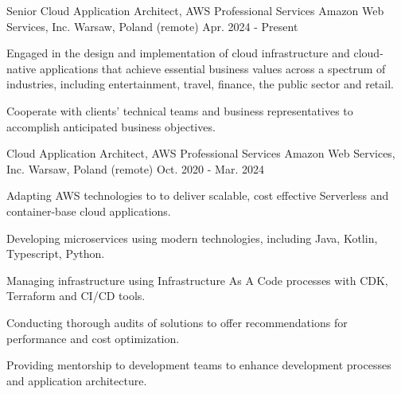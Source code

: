 

\begin{cventries}

  \cventry
    {Senior Cloud Application Architect, AWS Professional Services} %
    {Amazon Web Services, Inc.} %
    {Warsaw, Poland (remote)} %
    {Apr. 2024 - Present} %
    {
      \begin{cvitems} %
       \item {Engaged in the design and implementation of cloud infrastructure and cloud-native applications that achieve essential business values across a spectrum of industries, including entertainment, travel, finance, the public sector and retail.}
              \item {Cooperate with clients' technical teams and business representatives to accomplish anticipated business objectives.}
\
      \end{cvitems}
    }


  \cventry
    {Cloud Application Architect, AWS Professional Services} %
    {Amazon Web Services, Inc.} %
    {Warsaw, Poland (remote)} %
    {Oct. 2020 - Mar. 2024} %
    {
      \begin{cvitems} %
       \item {Adapting AWS technologies to to deliver scalable, cost effective Serverless and container-base cloud applications.}
       \item {Developing microservices using modern technologies, including Java, Kotlin, Typescript, Python. }
       \item {Managing infrastructure using Infrastructure As A Code processes with CDK, Terraform and CI/CD tools.}
       \item {Conducting thorough audits of solutions to offer recommendations for performance and cost optimization.}
       \item {Providing mentorship to development teams to enhance development processes and application architecture.}
      \end{cvitems}
    }


\end{cventries}
